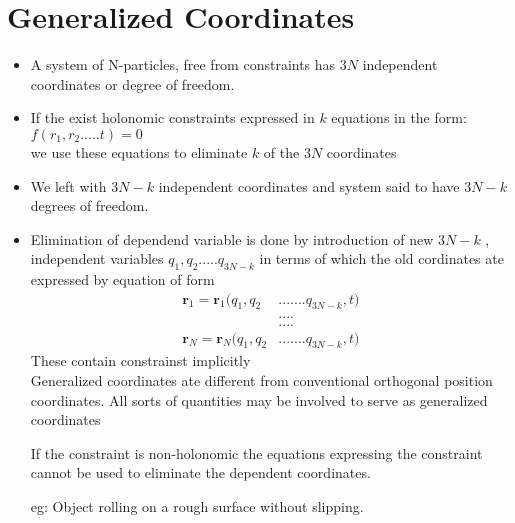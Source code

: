 \section{Generalized Coordinates}
\begin{itemize}
	\item A system of N-particles, free from constraints has $3N$ independent coordinates or degree of freedom. 
	\item If the exist holonomic constraints expressed in $k$ equations in the form:\\
	$f(r_1,r_2.....t)=0$\\
	we use these equations to eliminate $k$ of the $3N$ coordinates
	\item We left with $3N-k$ independent coordinates and system said to have $3N-k$ degrees of freedom.
	\item Elimination of dependend variable is done by introduction of new $3N-k$ , independent variables $q_1,q_2.....q_{3N-k}$ in terms of which the old cordinates ate expressed by equation of form
\begin{align*}
	\textbf{r}_1=\textbf{r}_1(q_1,q_2&.......q_{3N-k}, t)\\
	&....\\
	&....\\
	\textbf{r}_N=\textbf{r}_N(q_1,q_2&.......q_{3N-k}, t)
\end{align*}
	These contain constrainst implicitly\\
	Generalized coordinates ate different from conventional orthogonal position coordinates. All sorts of quantities  may be involved to serve as generalized coordinates
	\begin{note}
		If the constraint is non-holonomic the equations expressing the constraint cannot be used to eliminate the dependent coordinates.
	\end{note}
	eg: Object rolling on a rough surface without slipping.
\end{itemize}
